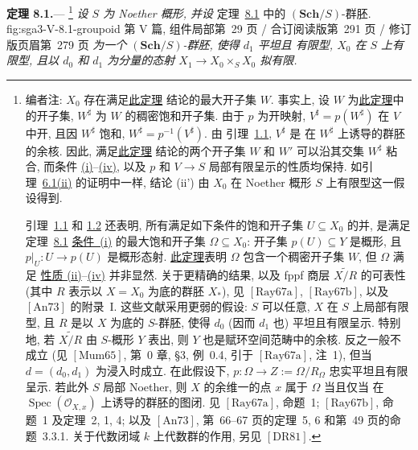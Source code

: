 \medskip
{}\label{thm:sga3-V-8.1}
\noindent\textbf{定理 8.1.}---%
\footnote{\label{note:sga3-V-44}编者注: \(X_0\) 存在满足\hyperref[thm:sga3-V-8.1]{此定理}
结论的最大开子集 \(W\).
事实上, 设 \(W\) 为\hyperref[thm:sga3-V-8.1]{此定理}中的开子集,
\(W^\sharp\) 为 \(W\) 的稠密饱和开子集. 由于 \(p\)
为开映射, \(V^\sharp=p(W^\sharp)\) 在 \(V\) 中开,
且因 \(W^\sharp\) 饱和,
\(W^\sharp=p^{-1}(V^\sharp)\). 由
引理~\hyperref[lem:sga3-V-1.1]{1.1}, \(V^\sharp\) 是
在 \(W^\sharp\) 上诱导的群胚的余核. 因此, 满足\hyperref[thm:sga3-V-8.1]{此定理}
结论的两个开子集 \(W\) 和 \(W'\) 可以沿其交集
\(W^\sharp\) 粘合, 而条件 \hyperref[thm:sga3-V-8.1-i]{(i)}--\hyperref[thm:sga3-V-8.1-iv]{(iv)},
以及 \(p\) 和 \(V\to S\) 局部有限呈示的性质均保持.
如引理~\hyperref[lem:sga3-V-6.1-ii]{6.1(ii)} 的证明中一样,
结论 (ii') 由 \(X_0\) 在 Noether 概形
\(S\) 上有限型这一假设得到.

引理~\hyperref[lem:sga3-V-1.1]{1.1} 和
\hyperref[sga3:exp5:lemma:1.2]{1.2} 还表明, 所有满足如下条件的饱和开子集
\(U\subseteq X_0\) 的并, 是满足定理~\hyperref[thm:sga3-V-8.1]{8.1}
\hyperref[thm:sga3-V-8.1-i]{条件~(i)} 的最大饱和开子集
\(\Omega\subseteq X_0\): 开子集
\(p(U)\subseteq Y\) 是概形, 且
\(p|_U:U\to p(U)\) 是概形态射.
\hyperref[thm:sga3-V-8.1]{此定理}表明
\(\Omega\) 包含一个稠密开子集 \(W\), 但 \(\Omega\) 满足
\hyperref[thm:sga3-V-8.1-ii]{性质 (ii)}--\hyperref[thm:sga3-V-8.1-iv]{(iv)} 并非显然.
关于更精确的结果, 以及 fppf 商层
\(\widetilde{X/R}\) 的可表性 (其中 \(R\) 表示以 \(X=X_0\) 为底的群胚 \(X_\ast\)),
见 \(\hyperref[bib:sga3-V-Ray67a]{[\mathrm{Ray67a}]}\), \(\hyperref[bib:sga3-V-Ray67b]{[\mathrm{Ray67b}]}\),
以及 \(\hyperref[bib:sga3-V-An73]{[\mathrm{An73}]}\) 的附录~I.
这些文献采用更弱的假设:
\(S\) 可以任意, \(X\) 在 \(S\) 上局部有限型,
且 \(R\) 是以 \(X\) 为底的 \(S\)-群胚, 使得 \(d_0\)
(因而 \(d_1\) 也) 平坦且有限呈示. 特别地, 若
\(\widetilde{X/R}\) 由 \(S\)-概形 \(Y\) 表出, 则 \(Y\)
也是赋环空间范畴中的余核. 反之一般不成立
(见 \(\hyperref[bib:sga3-V-Mum65]{[\mathrm{Mum65}]}\), 第~0 章, \S3,
例~0.4, 引于 \(\hyperref[bib:sga3-V-Ray67a]{[\mathrm{Ray67a}]}\), 注~1),
但当 \(d=(d_0,d_1)\) 为浸入时成立. 在此假设下,
\(p:\Omega\to Z:=\Omega/R_\Omega\) 忠实平坦且有限呈示.
若此外 \(S\) 局部 Noether, 则
\(X\) 的余维一的点 \(x\) 属于 \(\Omega\) 当且仅当
在 \(\operatorname{Spec}(\mathcal O_{X,x})\) 上诱导的群胚的图闭.
见
\(\hyperref[bib:sga3-V-Ray67a]{[\mathrm{Ray67a}]}\), 命题~1;
\(\hyperref[bib:sga3-V-Ray67b]{[\mathrm{Ray67b}]}\),
命题~1 及定理~2, 1, 4; 以及 \(\hyperref[bib:sga3-V-An73]{[\mathrm{An73}]}\),
第~66--67 页的定理~5, 6 和第~49 页的命题~3.3.1.
关于代数闭域 \(k\) 上代数群的作用,
另见 \(\hyperref[bib:sga3-V-DR81]{[\mathrm{DR81}]}\).}%
\textit{设 \(S\) 为 Noether 概形, 并设}
  {定理~\hyperref[thm:sga3-V-8.1]{8.1} 中的 \((\mathbf{Sch}/S)\)-群胚.}
  {fig:sga3-V-8.1-groupoid}
  {第 V 篇, 组件局部第~29 页 / 合订阅读版第~291 页 / 修订版页眉第~279 页}
\textit{为一个 \((\mathbf{Sch}/S)\)-群胚, 使得 \(d_1\) 平坦且
有限型, \(X_0\) 在 \(S\) 上有限型, 且以 \(d_0\) 和 \(d_1\) 为分量的态射
\(X_1\to X_0\times_S X_0\)
拟有限.}


